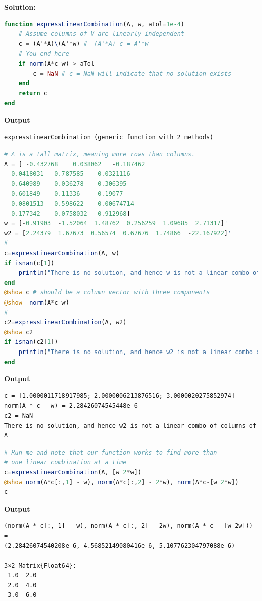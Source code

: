 \textbf{Solution:}

\begin{lstlisting}[language=Julia,style=mystyle]
function expressLinearCombination(A, w, aTol=1e-4)
    # Assume columns of V are linearly independent
    c = (A'*A)\(A'*w) #  (A'*A) c = A'*w
    # You end here
    if norm(A*c-w) > aTol
        c = NaN # c = NaN will indicate that no solution exists
    end
    return c
end
\end{lstlisting}
\textbf{Output} 
\begin{verbatim}
expressLinearCombination (generic function with 2 methods)
\end{verbatim}

\begin{lstlisting}[language=Julia,style=mystyle]
# A is a tall matrix, meaning more rows than columns.
A = [ -0.432768    0.038062   -0.187462
 -0.0418031  -0.787585    0.0321116
  0.640989   -0.036278    0.306395
  0.601849    0.11336    -0.19077
 -0.0801513   0.598622   -0.00674714
 -0.177342    0.0758032   0.912968]
w = [-0.91903  -1.52064  1.48762  0.256259  1.09685  2.71317]'
w2 = [2.24379  1.67673  0.56574  0.67676  1.74866  -22.167922]'
#
c=expressLinearCombination(A, w)
if isnan(c[1])
    println("There is no solution, and hence w is not a linear combo of columns of A")
end
@show c # should be a column vector with three components
@show  norm(A*c-w)
#
c2=expressLinearCombination(A, w2)
@show c2
if isnan(c2[1])
    println("There is no solution, and hence w2 is not a linear combo of columns of A")
end
\end{lstlisting}
\textbf{Output} 
\begin{verbatim}
c = [1.0000011718917985; 2.0000006213876516; 3.0000020275852974]
norm(A * c - w) = 2.28426074545448e-6
c2 = NaN
There is no solution, and hence w2 is not a linear combo of columns of A
\end{verbatim}

\begin{lstlisting}[language=Julia,style=mystyle]
# Run me and note that our function works to find more than 
# one linear combination at a time
c=expressLinearCombination(A, [w 2*w])
@show norm(A*c[:,1] - w), norm(A*c[:,2] - 2*w), norm(A*c-[w 2*w])
c
\end{lstlisting}
\textbf{Output} 
\begin{verbatim}
(norm(A * c[:, 1] - w), norm(A * c[:, 2] - 2w), norm(A * c - [w 2w])) =
(2.28426074540208e-6, 4.56852149080416e-6, 5.107762304797088e-6)

3×2 Matrix{Float64}:
 1.0  2.0
 2.0  4.0
 3.0  6.0
\end{verbatim}
\Qed

